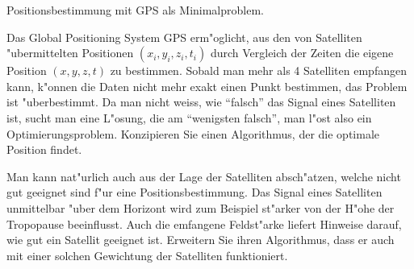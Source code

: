 \begin{aufgabe}
Positionsbestimmung mit GPS als Minimalproblem.
\end{aufgabe}

{\parindent 0pt Das Global Positioning System GPS}
erm"oglicht, aus den von Satelliten "ubermittelten Positionen
$(x_i, y_i, z_i, t_i)$ durch Vergleich der Zeiten die eigene
Position $(x,y,z,t)$
zu bestimmen. Sobald man mehr als 4 Satelliten empfangen kann,
k"onnen die Daten nicht mehr exakt einen Punkt bestimmen, das
Problem ist "uberbestimmt. Da man nicht weiss, wie ``falsch''
das Signal eines Satelliten ist, sucht man eine L"osung, die am
``wenigsten falsch'', man l"ost also ein Optimierungsproblem.
Konzipieren Sie einen Algorithmus, der die optimale Position findet.

Man kann nat"urlich auch aus der Lage der Satelliten absch"atzen, welche
nicht gut geeignet sind f"ur eine Positionsbestimmung. Das Signal
eines Satelliten unmittelbar "uber dem Horizont wird zum Beispiel st"arker
von der H"ohe der Tropopause beeinflusst. Auch die emfangene Feldst"arke
liefert Hinweise darauf, wie gut ein Satellit geeignet ist. Erweitern
Sie ihren Algorithmus, dass er auch mit einer solchen Gewichtung der
Satelliten funktioniert.

